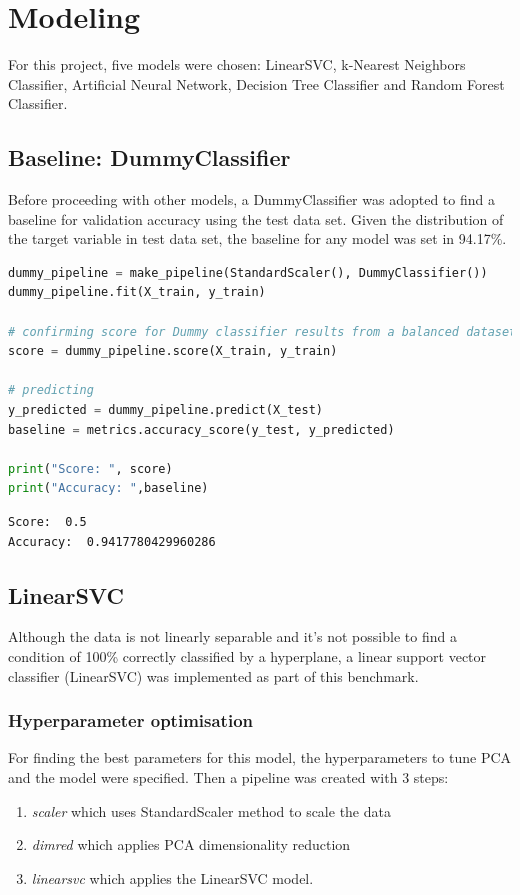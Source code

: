 \documentclass{article}
\begin{document}
\section{Modeling}

For this project, five models were chosen: LinearSVC, k-Nearest Neighbors Classifier, Artificial Neural Network, Decision Tree Classifier and Random Forest Classifier. 

\subsection{Baseline: DummyClassifier}
Before proceeding with other models, a DummyClassifier was adopted to find a baseline for validation accuracy using the test data set. Given the distribution of the target variable in test data set, the baseline for any model was set in 94.17\%.

\begin{lstlisting}[language=Python]
dummy_pipeline = make_pipeline(StandardScaler(), DummyClassifier())
dummy_pipeline.fit(X_train, y_train)

# confirming score for Dummy classifier results from a balanced dataset
score = dummy_pipeline.score(X_train, y_train)

# predicting
y_predicted = dummy_pipeline.predict(X_test)
baseline = metrics.accuracy_score(y_test, y_predicted)

print("Score: ", score)
print("Accuracy: ",baseline)
\end{lstlisting}
\begin{verbatim}
Score:  0.5
Accuracy:  0.9417780429960286
\end{verbatim}

\subsection{LinearSVC}
Although the data is not linearly separable and it's not possible to find a condition of 100\% correctly classified by a hyperplane, a linear support vector classifier (LinearSVC) was implemented as part of this benchmark.

\subsubsection{Hyperparameter optimisation}
For finding the best parameters for this model, the hyperparameters to tune PCA and the model were specified. Then a pipeline was created with 3 steps:
\begin{enumerate}
\item \emph{scaler} which uses StandardScaler method to scale the data
\item \emph{dimred} which applies PCA dimensionality reduction
\item \emph{linearsvc} which applies the LinearSVC model.
\end{enumerate}
\end{document}
